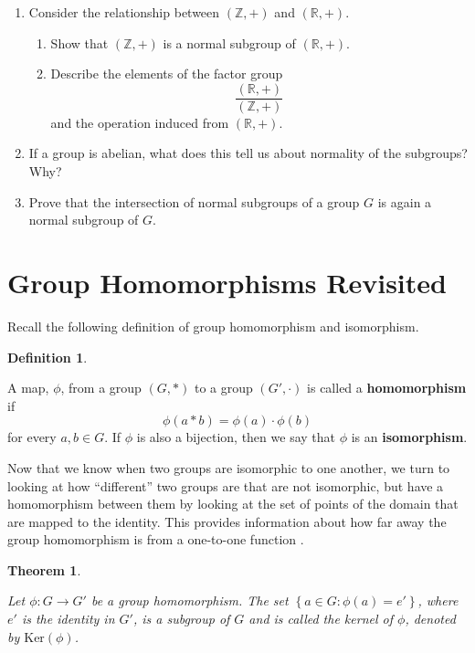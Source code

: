 \documentclass[
]{book}
\providecommand{\tightlist}{%
  \setlength{\itemsep}{0pt}\setlength{\parskip}{0pt}}
\newtheorem{theorem}{Theorem}[chapter]
\theoremstyle{definition}
\newtheorem{definition}{Definition}[chapter]
\theoremstyle{definition}
\theoremstyle{definition}
\theoremstyle{definition}
\theoremstyle{remark}
\begin{document}
\begin{enumerate}
\def\labelenumi{\arabic{enumi}.}
\item
  Consider the relationship between \((\mathbb{Z},+)\) and \((\mathbb{R},+)\).

  \begin{enumerate}
  \def\labelenumii{\alph{enumii}.}
  \tightlist
  \item
    Show that \((\mathbb{Z},+)\) is a normal subgroup of \((\mathbb{R},+)\).
  \item
    Describe the elements of the factor group \[\frac{(\mathbb{R},+)}{(\mathbb{Z},+)}\] and the operation induced from \((\mathbb{R},+)\).
  \end{enumerate}
\item
  If a group is abelian, what does this tell us about normality of the subgroups? Why?
\item
  Prove that the intersection of normal subgroups of a group \(G\) is again a normal subgroup of \(G\).
\end{enumerate}

\hypertarget{group-homomorphisms-revisited}{%
\section{Group Homomorphisms Revisited}\label{group-homomorphisms-revisited}}

Recall the following definition of group homomorphism and isomorphism.

\begin{definition}
\protect\hypertarget{def:unlabeled-div-225}{}\label{def:unlabeled-div-225}

A map, \(\phi\), from a group \((G,*)\) to a group \((G',\cdot)\) is called a \textbf{homomorphism} if \[ \phi(a*b)=\phi(a) \cdot \phi(b)\] for every \(a,b\in G\). If \(\phi\) is also a bijection, then we say that \(\phi\) is an \textbf{isomorphism}.

\end{definition}

Now that we know when two groups are isomorphic to one another, we turn to looking at how ``different'' two groups are that are not isomorphic, but have a homomorphism between them by looking at the set of points of the domain that are mapped to the identity. This provides information about how far away the group homomorphism is from a one-to-one function .

\begin{theorem}
\protect\hypertarget{thm:unlabeled-div-226}{}\label{thm:unlabeled-div-226}

Let \(\phi: G \rightarrow G'\) be a group homomorphism. The set \(\left\{ a\in G : \phi(a)=e' \right\}\), where \(e'\) is the identity in \(G'\), is a subgroup of \(G\) and is called the kernel of \(\phi\), denoted by \(\mbox{Ker}(\phi)\).

\end{theorem}
\end{document}
